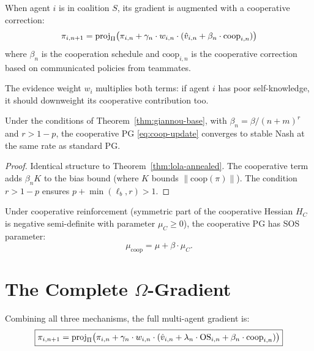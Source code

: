 When agent $i$ is in coalition $S$, its gradient is augmented with a cooperative correction:
\begin{equation}\label{eq:coop-update}
    \pi_{i,n+1} = \operatorname{proj}_\Pi\bigl(\pi_{i,n} + \gamma_n \cdot w_{i,n} \cdot (\hat{v}_{i,n} + \beta_n \cdot \text{coop}_{i,n})\bigr)
\end{equation}
where $\beta_n$ is the cooperation schedule and $\text{coop}_{i,n}$ is the cooperative correction based on communicated policies from teammates.

The evidence weight $w_i$ multiplies both terms: if agent $i$ has poor self-knowledge, it should downweight its cooperative contribution too.

\begin{theorem}\label{thm:coop-conv}
Under the conditions of Theorem~\ref{thm:giannou-base}, with $\beta_n = \beta/(n+m)^r$ and $r > 1-p$, the cooperative PG \eqref{eq:coop-update} converges to stable Nash at the same rate as standard PG.
\end{theorem}

\begin{proof}
Identical structure to Theorem~\ref{thm:lola-annealed}. The cooperative term adds $\beta_n K$ to the bias bound (where $K$ bounds $\|\text{coop}(\pi)\|$). The condition $r > 1-p$ ensures $p + \min(\ell_b, r) > 1$.
\end{proof}

\begin{theorem}\label{thm:coop-basin}
Under cooperative reinforcement (symmetric part of the cooperative Hessian $H_C$ is negative semi-definite with parameter $\mu_C \geq 0$), the cooperative PG has SOS parameter:
\begin{equation}
    \mu_{\text{coop}} = \mu + \beta \cdot \mu_C.
\end{equation}
\end{theorem}


\section{The Complete $\Omega$-Gradient}

Combining all three mechanisms, the full multi-agent gradient is:
\begin{equation}\label{eq:omega-full}
\boxed{
    \pi_{i,n+1} = \operatorname{proj}_\Pi\bigl(\pi_{i,n} + \gamma_n \cdot w_{i,n} \cdot (\hat{v}_{i,n} + \lambda_n \cdot \text{OS}_{i,n} + \beta_n \cdot \text{coop}_{i,n})\bigr)
}
\end{equation}

